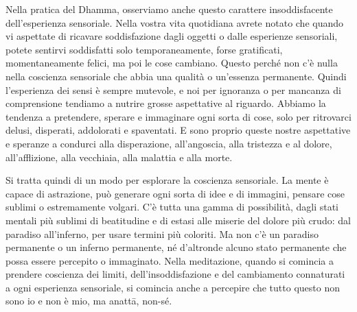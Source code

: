 Nella pratica del Dhamma, osserviamo anche questo carattere
insoddisfacente dell'esperienza sensoriale. Nella vostra vita quotidiana
avrete notato che quando vi aspettate di ricavare soddisfazione dagli
oggetti o dalle esperienze sensoriali, potete sentirvi soddisfatti solo
temporaneamente, forse gratificati, momentaneamente felici, ma poi le
cose cambiano. Questo perché non c'è nulla nella coscienza sensoriale
che abbia una qualità o un'essenza permanente. Quindi l'esperienza dei
sensi è sempre mutevole, e noi per ignoranza o per mancanza di
comprensione tendiamo a nutrire grosse aspettative al riguardo. Abbiamo
la tendenza a pretendere, sperare e immaginare ogni sorta di cose, solo
per ritrovarci delusi, disperati, addolorati e spaventati. E sono
proprio queste nostre aspettative e speranze a condurci alla
disperazione, all'angoscia, alla tristezza e al dolore, all'afflizione,
alla vecchiaia, alla malattia e alla morte.

Si tratta quindi di un modo per esplorare la coscienza sensoriale. La
mente è capace di astrazione, può generare ogni sorta di idee e di
immagini, pensare cose sublimi o estremamente volgari. C'è tutta una
gamma di possibilità, dagli stati mentali più sublimi di beatitudine e
di estasi alle miserie del dolore più crudo: dal paradiso all'inferno,
per usare termini più coloriti. Ma non c'è un paradiso permanente o un
inferno permanente, né d'altronde alcuno stato permanente che possa
essere percepito o immaginato. Nella meditazione, quando si comincia a
prendere coscienza dei limiti, dell'insoddisfazione e del cambiamento
connaturati a ogni esperienza sensoriale, si comincia anche a percepire
che tutto questo non sono io e non è mio, ma anattā, non-sé.

